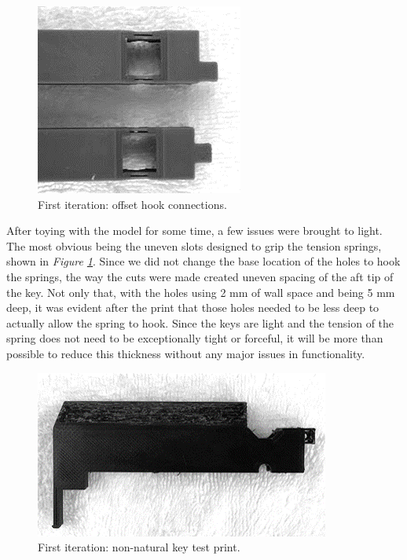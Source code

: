 \begin{figure}[h!]
  \centering
  \includegraphics[width=0.6\linewidth]{image/Print2.png}
  \caption{First iteration: offset hook connections.}
  \label{fig:print2}
\end{figure}

After toying with the model for some time, a few issues were brought to light. The most obvious being the uneven slots designed to grip the tension springs, shown in \textit{Figure \ref{fig:print2}}. Since we did not change the base location of the holes to hook the springs, the way the cuts were made created uneven spacing of the aft tip of the key. Not only that, with the holes using 2 mm of wall space and being 5 mm deep, it was evident after the print that those holes needed to be less deep to actually allow the spring to hook. Since the keys are light and the tension of the spring does not need to be exceptionally tight or forceful, it will be more than possible to reduce this thickness without any major issues in functionality.

\begin{figure}[h!]
  \centering
  \includegraphics[width=0.8\linewidth]{image/Print3.png}
  \caption{First iteration: non-natural key test print.}
  \label{fig:print3}
\end{figure}

